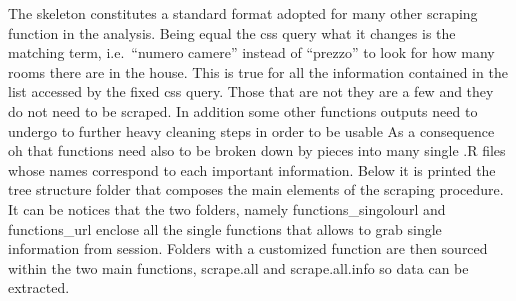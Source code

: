 \documentclass[
  12pt,
  a4paper,
  oneside]{book}
\newenvironment{Shaded}{\begin{snugshade}}{\end{snugshade}}
\newcommand{\DataTypeTok}[1]{\textcolor[rgb]{0.13,0.29,0.53}{#1}}
\newcommand{\ErrorTok}[1]{\textcolor[rgb]{0.64,0.00,0.00}{\textbf{#1}}}
\newcommand{\KeywordTok}[1]{\textcolor[rgb]{0.13,0.29,0.53}{\textbf{#1}}}
\newcommand{\NormalTok}[1]{#1}
\newcommand{\StringTok}[1]{\textcolor[rgb]{0.31,0.60,0.02}{#1}}
\begin{document}
\begin{Shaded}
\begin{Highlighting}[]
{\NormalTok{                  ...}
                  
\NormalTok{                   combine =}\StringTok{ }\KeywordTok{tibble}\NormalTok{(}\DataTypeTok{ID        =}\NormalTok{ id,}
                                     \DataTypeTok{LAT       =}\NormalTok{ lat, }
                                     \DataTypeTok{LONG      =}\NormalTok{ long,}
                                     \DataTypeTok{LOCATION  =}\NormalTok{ location,}
                                     \DataTypeTok{CONDOM    =}\NormalTok{ condom,}
                                     \DataTypeTok{BUILDAGE  =}\NormalTok{ buildage,}
                                    
\NormalTok{                  ...}
                  
                  
                  \KeywordTok{return}\NormalTok{(combine) }
                  \ErrorTok{\}}
  \KeywordTok{stopCluster}\NormalTok{(cl)}
  \KeywordTok{return}\NormalTok{(ALL)}
\ErrorTok{\}}
\end{Highlighting}
\end{Shaded}

The skeleton constitutes a standard format adopted for many other scraping function in the analysis. Being equal the css query what it changes is the matching term, i.e.~``numero camere'' instead of ``prezzo'' to look for how many rooms there are in the house. This is true for all the information contained in the list accessed by the fixed css query. Those that are not they are a few and they do not need to be scraped.
In addition some other functions outputs need to undergo to further heavy cleaning steps in order to be usable As a consequence oh that functions need also to be broken down by pieces into many single .R files whose names correspond to each important information.
Below it is printed the tree structure folder that composes the main elements of the scraping procedure. It can be notices that the two folders, namely functions\_singolourl and functions\_url enclose all the single functions that allows to grab single information from session. Folders with a customized function are then sourced within the two main functions, scrape.all and scrape.all.info so data can be extracted.
\end{document}
